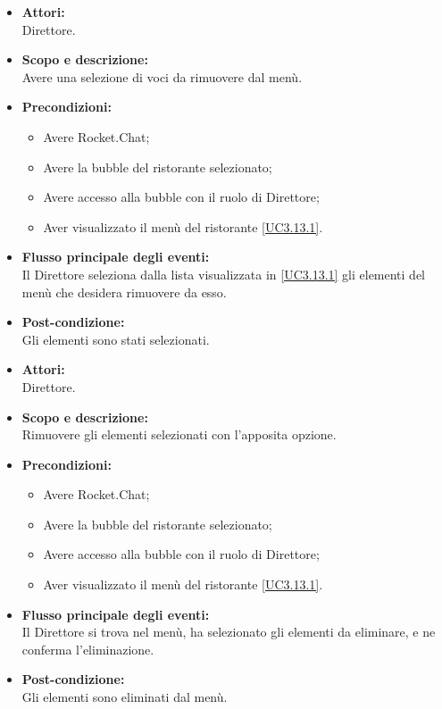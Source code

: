 
\begin{itemize}
	\item \textbf{Attori:}
	\\Direttore.
	\item \textbf{Scopo e descrizione:} 
	\\Avere una selezione di voci da rimuovere dal menù.
	\item \textbf{Precondizioni:}
	\begin{itemize}
		\item Avere Rocket.Chat;
		\item Avere la bubble del ristorante selezionato;
		\item Avere accesso alla bubble con il ruolo di Direttore;
		\item Aver visualizzato il menù del ristorante \ref{UC3.13.1}.
	\end{itemize}
	\item \textbf{Flusso principale degli eventi:}
	\\Il Direttore seleziona dalla lista visualizzata in \ref{UC3.13.1} gli elementi del menù che desidera rimuovere da esso.
	\item \textbf{Post-condizione:}
	\\Gli elementi sono stati selezionati.
\end{itemize}


\begin{itemize}
	\item \textbf{Attori:}
	\\Direttore.
	\item \textbf{Scopo e descrizione:} 
	\\Rimuovere gli elementi selezionati con l'apposita opzione.
	\item \textbf{Precondizioni:}
	\begin{itemize}
		\item Avere Rocket.Chat;
		\item Avere la bubble del ristorante selezionato;
		\item Avere accesso alla bubble con il ruolo di Direttore;
		\item Aver visualizzato il menù del ristorante \ref{UC3.13.1}.
	\end{itemize}
	\item \textbf{Flusso principale degli eventi:}
	\\Il Direttore si trova nel menù, ha selezionato gli elementi da eliminare, e ne conferma l'eliminazione.
	\item \textbf{Post-condizione:}
	\\Gli elementi sono eliminati dal menù.
\end{itemize}

